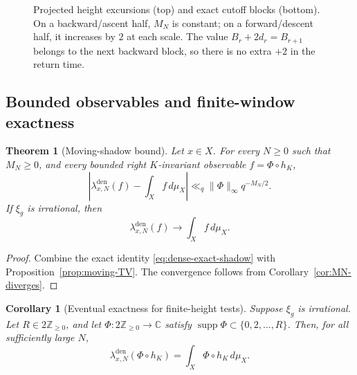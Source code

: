 \documentclass[11pt]{amsart}
\theoremstyle{definition}
\theoremstyle{plain}
\newtheorem{corollary}[definition]{Corollary}
\newtheorem{theorem}[definition]{Theorem}
\newcommand{\ZZ}{\mathbb Z}
\newcommand{\CC}{\mathbb C}
\begin{document}
\begin{figure}[H]
\caption{Projected height excursions (top) and exact cutoff blocks (bottom).
On a backward/ascent half, \(M_N\) is constant; on a forward/descent half, it
increases by \(2\) at each scale.  The value \(B_r+2d_r=B_{r+1}\) belongs to
the next backward block, so there is no extra \(+2\) in the return time.}
\label{fig:cf-blocks}
\end{figure}

\subsection{Bounded observables and finite-window exactness}
\begin{theorem}[Moving-shadow bound]\label{thm:dense-bounded}
Let \(x\in X\).  For every \(N\ge0\) such that \(M_N\ge0\), and every bounded
right \(K\)-invariant observable \(f=\Phi\circ h_K\),
\[
\left|\lambda_{x,N}^{\mathrm{den}}(f)-\int_Xf\,d\mu_X\right|
 \ll_q\|\Phi\|_\infty q^{-M_N/2}.
\]
If \(\xi_g\) is irrational, then
\[
\lambda_{x,N}^{\mathrm{den}}(f)\longrightarrow\int_Xf\,d\mu_X.
\]
\end{theorem}

\begin{proof}
Combine the exact identity \eqref{eq:dense-exact-shadow} with
Proposition~\ref{prop:moving-TV}.  The convergence follows from
Corollary~\ref{cor:MN-diverges}.
\end{proof}

\begin{corollary}[Eventual exactness for finite-height tests]
\label{cor:dense-finite-exact}
Suppose \(\xi_g\) is irrational.  Let \(R\in2\ZZ_{\ge0}\), and let
\(\Phi:2\ZZ_{\ge0}\to\CC\) satisfy
\(\operatorname{supp}\Phi\subset\{0,2,\ldots,R\}\).  Then, for all sufficiently
large \(N\),
\[
\lambda_{x,N}^{\mathrm{den}}(\Phi\circ h_K)
 =\int_X\Phi\circ h_K\,d\mu_X.
\]
\end{corollary}
\end{document}
